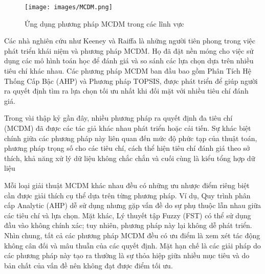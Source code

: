 \begin{figure}[H]
    \centering
    \texttt{[image: images/MCDM.png]}
    \vspace{0.6cm}
    \caption{Ứng dụng phương pháp MCDM trong các lĩnh vực}
\end{figure}


Các nhà nghiên cứu như Keeney và Raiffa là những người tiên phong trong việc phát triển khái niệm và phương pháp MCDM. Họ đã đặt nền móng cho việc sử dụng các mô hình toán học để đánh giá và so sánh các lựa chọn dựa trên nhiều tiêu chí khác nhau. Các phương pháp MCDM ban đầu bao gồm Phân Tích Hệ Thống Cấp Bậc (AHP) và Phương pháp TOPSIS, được phát triển để giúp người ra quyết định tìm ra lựa chọn tối ưu nhất khi đối mặt với nhiều tiêu chí đánh giá. \cite{thutucphapluat}

Trong vài thập kỷ gần đây, nhiều phương pháp ra quyết định đa tiêu chí (MCDM) đã được các tác giả khác nhau phát triển hoặc cải tiến. Sự khác biệt chính giữa các phương pháp này liên quan đến mức độ phức tạp của thuật toán, phương pháp trọng số cho các tiêu chí, cách thể hiện tiêu chí đánh giá theo sở thích, khả năng xử lý dữ liệu không chắc chắn và cuối cùng là kiểu tổng hợp dữ liệu 

Mỗi loại giải thuật MCDM khác nhau đều có những ưu nhược điểm riêng biệt cần được giải thích cụ thể dựa trên từng phương pháp. Ví dụ, Quy trình phân cấp Analytic (AHP) dễ sử dụng nhưng gặp vấn đề do sự phụ thuộc lẫn nhau giữa các tiêu chí và lựa chọn. Mặt khác, Lý thuyết tập Fuzzy (FST) có thể sử dụng đầu vào không chính xác; tuy nhiên, phương pháp này lại không dễ phát triển. Nhìn chung, tất cả các phương pháp MCDM đều có ưu điểm là xem xét tác động không cân đối và mâu thuẫn của các quyết định. Mặt hạn chế là các giải pháp do các phương pháp này tạo ra thường là sự thỏa hiệp giữa nhiều mục tiêu và do bản chất của vấn đề nên không đạt được điểm tối ưu. 

